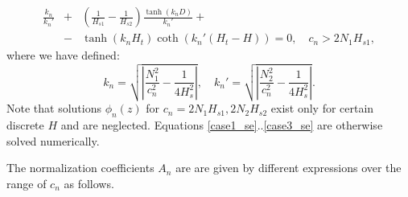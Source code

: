 \documentclass[a4paper,10pt]{article}
\begin{document}
%
\begin{eqnarray}
\label{case3_se}
\frac{k_n }{ k_n ' }  & + & \left( \frac{1}{H_{s1}} - \frac{1}{H_{s2}} \right) \frac{\tanh (k_n D) }{ k_n ' } + \\  \nonumber
                             &  - & \tanh \left( k_n H_t \right) \coth \left( k_n ' (H_t - H )\right) = 0, \quad  c_n >  2 N_1 H_{s1} ,
\end{eqnarray}
%
where we have defined:
%
\begin{equation}
k_n =  \sqrt{ \left| \frac{N_1^2}{c_n^2} - \frac{1}{ 4 H_s^2} \right| } , \quad k_n ' = \sqrt{ \left| \frac{N_2^2}{c_n^2} - \frac{1}{4 H_s^2} \right| }.
\end{equation}
%
Note that solutions $\phi_n(z)$ for $c_n = 2 N_1 H_{s1}, 2 N_2 H_{s2}$ exist only for certain discrete $H$ and are neglected.
Equations \ref{case1_se}..\ref{case3_se} are otherwise solved numerically.


The normalization coefficients $A_n$ are are given by different expressions over the range of $c_n$ as follows. 
\end{document}
